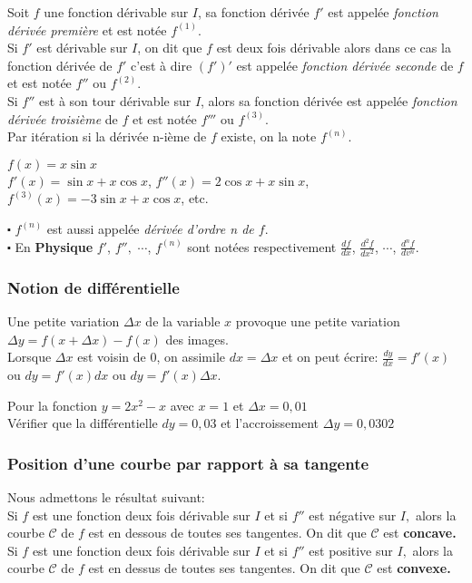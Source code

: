  \begin{definition}
 Soit $ f $ une fonction dérivable sur $ I $, sa fonction  dérivée $ f' $ est appelée                            
  \emph{fonction dérivée première} et est notée $ f^{(1)}.$ \\
 Si $ f'$ est dérivable sur $ I $, on dit que $ f $ est deux fois dérivable alors dans ce cas la fonction  dérivée  de $ f' $ c'est à dire $ (f')' $ est  appelée \emph{fonction dérivée seconde} de $ f $ et est notée $ f'' $ ou $ f^{(2)} .$ \\ 
  Si $ f''$  est à son tour  dérivable sur $ I $, alors sa fonction  dérivée   est  appelée \emph{fonction dérivée troisième} de $ f $ et est notée $ f''' $ ou $ f^{(3)} .$ \\ 
 Par itération si la dérivée n-ième de $ f $ existe, on la note $ f^{(n)} .$   
 \end{definition}
 
  \begin{example}
 $ f(x)= x\sin x $ \\
 $ f'(x)=\sin x+x\cos x $, $ f''(x)=2\cos x+x\sin x $, $ f^{(3)}(x)=-3\sin x+x\cos x $, etc.
  \end{example}
   \begin{remark}
 $ \centerdot $ $ f^{(n)}$ est aussi appelée \emph{dérivée d'ordre n de $ f. $} \\
  $ \centerdot $ En \textbf{\color{magenta}Physique} $f' $, $ f'', $ $\cdots$, $ f^{(n)}$ sont notées respectivement $\frac{df}{dx} $, $ \frac{d^{2}f}{dx^{2}} $, $\cdots$, $ \frac{d^{n}f}{dv^{n}}$.
 \end{remark}
\subsubsection*{Notion de différentielle}
Une petite variation $ \Delta x $ de la variable $ x $ provoque une petite variation  $ \Delta y = f(x+ \Delta x)-f(x) $ des images.\\ Lorsque $ \Delta x $ est voisin de $ 0 $, on assimile $ dx=\Delta x $ et on peut écrire: $ \frac{dy}{dx} =f'(x)$ ou $ dy=f'(x)dx $ ou $ dy=f'(x)\Delta x $.
\begin{example}
 Pour la fonction $ y=2x^2-x $ avec $x=1 $  et $\Delta x= 0,01 $ \\ Vérifier que la différentielle $dy=0,03  $ et l'accroissement $ \Delta y= 0,0302 $
\end{example}
\subsubsection*{Position d'une courbe par rapport à sa tangente}
  Nous admettons le résultat suivant:\\ Si $ f $ est une fonction deux fois dérivable sur $ I $ et si $ f'' $ est négative sur $ I, $ alors la courbe $\mathcal{C} $ de $ f$ est en dessous de toutes ses tangentes. On dit  que  $\mathcal{C} $ est \textbf{ concave.}\\
   Si $ f $ est une fonction deux fois dérivable sur $ I $ et si $ f'' $ est positive sur $ I, $ alors la courbe $\mathcal{C} $ de $ f$ est en dessus de toutes ses tangentes. On dit  que  $\mathcal{C} $ est \textbf{ convexe.}
